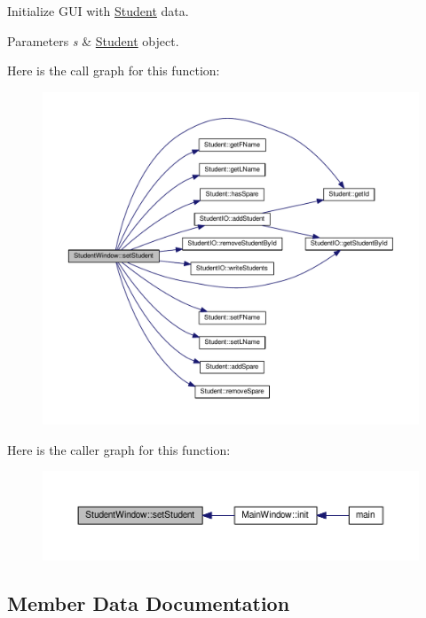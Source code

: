 Initialize G\+UI with \hyperlink{class_student}{Student} data. 


\begin{DoxyParams}{Parameters}
{\em s} & \hyperlink{class_student}{Student} object. \\
\hline
\end{DoxyParams}
Here is the call graph for this function\+:
\nopagebreak
\begin{figure}[H]
\begin{center}
\leavevmode
\includegraphics[width=350pt]{class_student_window_ad413a2d54e47846392e75383e5ff8774_cgraph}
\end{center}
\end{figure}
Here is the caller graph for this function\+:
\nopagebreak
\begin{figure}[H]
\begin{center}
\leavevmode
\includegraphics[width=350pt]{class_student_window_ad413a2d54e47846392e75383e5ff8774_icgraph}
\end{center}
\end{figure}


\subsection{Member Data Documentation}
\mbox{\label{class_student_window_acbbffa742dd57a3f3f8600b461ddf628}} 
